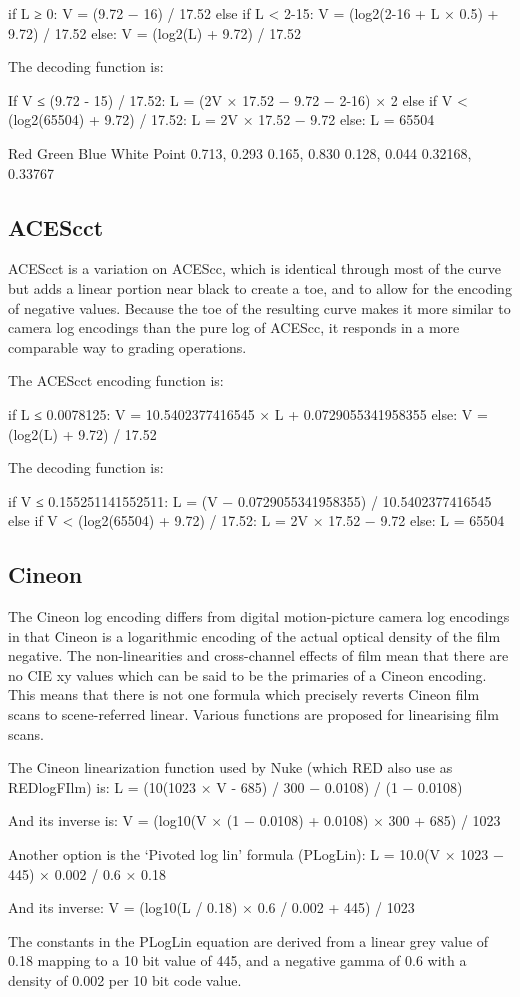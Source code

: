 	if L ≥ 0:
		V = (9.72 − 16) / 17.52
	else if L < 2-15:
		V = (log2(2-16 + L × 0.5) + 9.72) / 17.52
	else:
		V = (log2(L) + 9.72) / 17.52



The decoding function is:

	If V ≤ (9.72 - 15) / 17.52:
		L = (2V × 17.52 − 9.72 − 2-16) × 2
	else if V < (log2(65504) + 9.72) / 17.52:
		L = 2V × 17.52 − 9.72
	else:
		L = 65504


Red
Green
Blue
White Point
0.713, 0.293
0.165, 0.830
0.128, 0.044
0.32168, 0.33767

\subsection{ACEScct}
ACEScct is a variation on ACEScc, which is identical through most of the curve but adds a linear portion near black to create a toe, and to allow for the encoding of negative values. Because the toe of the resulting curve makes it more similar to camera log encodings than the pure log of ACEScc, it responds in a more comparable way to grading operations.

The ACEScct encoding function is:

	if L ≤ 0.0078125:
		V = 10.5402377416545 × L + 0.0729055341958355
	else:
		V = (log2(L) + 9.72) / 17.52



The decoding function is:

	if V ≤ 0.155251141552511:
		L = (V − 0.0729055341958355) / 10.5402377416545
	else if V < (log2(65504) + 9.72) / 17.52:
		L = 2V × 17.52 − 9.72
	else:
		L = 65504

\subsection{Cineon}

The Cineon log encoding differs from digital motion-picture camera log encodings in that Cineon is a logarithmic encoding of the actual optical density of the film negative. The non-linearities and cross-channel effects of film mean that there are no CIE xy values which can be said to be the primaries of a Cineon encoding. This means that there is not one formula which precisely reverts Cineon film scans to scene-referred linear. Various functions are proposed for linearising film scans.

The Cineon linearization function used by Nuke (which RED also use as REDlogFIlm) is:
	L = (10(1023 × V - 685) / 300 − 0.0108) / (1 − 0.0108)



And its inverse is:
	V = (log10(V × (1 − 0.0108) + 0.0108) × 300 + 685) / 1023

Another option is the ‘Pivoted log lin’ formula (PLogLin):
	L = 10.0(V × 1023 − 445) × 0.002 / 0.6 × 0.18



And its inverse:
	V = (log10(L / 0.18) × 0.6 / 0.002 + 445) / 1023

The constants in the PLogLin equation are derived from a linear grey value of 0.18 mapping to a 10 bit value of 445, and a negative gamma of 0.6 with a density of 0.002 per 10 bit code value.

